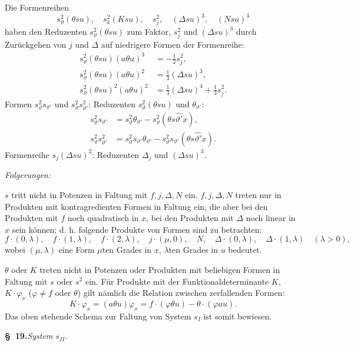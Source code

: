 Die Formenreihen
\[
 s_\vartheta^2(\theta su),\quad s_k^2(Ksu),\quad s_j^2,\quad (\Delta su)^3,\quad (Nsu)^3
\]
haben den Reduzenten $s_\vartheta^2(\theta su)$ zum Faktor, $s_j^2$ und $(\Delta su)^3$ durch Zurückgehen von $j$ und $\Delta$ auf niedrigere Formen der Formenreihe:
\[
\begin{aligned}
s_\vartheta^2(\theta su)(a\theta u)^3&=-\frac12s_j^2,\\
s_\vartheta^2(\theta su)(a\theta u)^2&=\frac13(\Delta su)^3,\\
s_\vartheta^2(\theta su)^2(a\theta u)^2&=\frac13(\Delta su)^4+\frac13s_j^2.
\end{aligned}
\]
Formen $s_\vartheta^2s_{\vartheta'}$ und $s_\vartheta^2s_{\vartheta'}^2$: Reduzenten $s_\vartheta^2(\theta su)$ und $\theta_{\vartheta'}$:
\[
\begin{aligned}
s_\vartheta^2s_{\vartheta'}&=s_\vartheta^2\theta_{\vartheta'}-s_\vartheta^2(\theta s\widehat{\vartheta'}x),\\
s_\vartheta^2s_{\vartheta'}^2&=s_\vartheta^2s_{\vartheta'}\theta_{\vartheta'}-s_\vartheta^2s_{\vartheta'}(\theta s\widehat{\vartheta'}x).
\end{aligned}
\]
Formenreihe $s_j(\Delta su)^2$: Reduzenten $\Delta_j$ und $(\Delta su)^3$.

\noindent\emph{Folgerungen:}

$s$ tritt nicht in Potenzen in Faltung mit $f,j,\Delta,N$ ein. $f,j,\Delta,N$ treten nur in Produkten mit kontragredienten Formen in Faltung ein, die aber bei den Produkten mit $f$ noch quadratisch in $x$, bei den Produkten mit $\Delta$ noch linear in $x$ sein können; d. h. folgende Produkte von Formen sind zu betrachten:
\[
 f\cdot(0,\lambda),\quad f\cdot(1,\lambda),\quad f\cdot(2,\lambda),\quad
 j\cdot(\mu,0),\quad N,\quad
 \Delta\cdot(0,\lambda),\quad \Delta\cdot(1,\lambda)\quad(\lambda>0),
\]
wobei $(\mu,\lambda)$ eine Form $\mu$ten Grades in $x$, $\lambda$ten Grades in $u$ bedeutet.

$\theta$ oder $K$ treten nicht in Potenzen oder Produkten mit beliebigen Formen in Faltung mit $s$ oder $s^2$ ein. Für Produkte mit der Funktionaldeterminante $K$, $K\cdot\varphi_x$ ($\varphi\ne f$ oder $\theta$) gilt nämlich die Relation zwischen zerfallenden Formen:
\[
K\cdot\varphi_x=(a\theta u)\varphi_x=f\cdot(\varphi\theta u)-\theta\cdot(\varphi a u).
\]
Das oben stehende Schema zur Faltung von System $s_I$ ist somit bewiesen.

\begin{center}
\textbf{\S\ 19.}\quad\emph{System $s_{II}$.}
\end{center}

